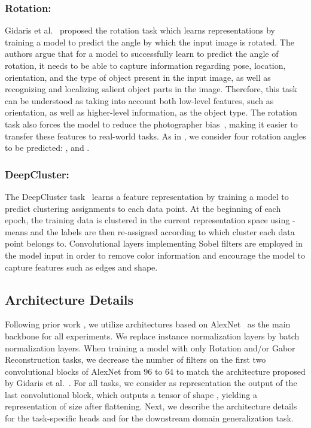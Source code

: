 \documentclass[runningheads]{llncs}
\begin{document}
\vspace{-5pt}\subsubsection{Rotation:} Gidaris et al.~\cite{gidaris2018unsupervised} proposed the rotation task which learns representations by training a model to predict the angle by which the input image is rotated. The authors argue that for a model to successfully learn to predict the angle of rotation, it needs to be able to capture information regarding pose, location, orientation, and the type of object present in the input image, as well as recognizing and localizing salient object parts in the image. Therefore, this task can be understood as taking into account both low-level features, such as orientation, as well as higher-level information, as the object type. 
The rotation task also forces the model to reduce the photographer bias~\cite{feng2019self}, making it easier to transfer these features to real-world tasks. 
As in \cite{gidaris2018unsupervised}, we consider four rotation angles to be predicted: , and .

\vspace{-5pt}\subsubsection{DeepCluster:}
The DeepCluster task~\cite{caron2018deep} learns a feature representation by training a model to predict clustering assignments to each data point. At the beginning of each epoch, the training data is clustered in the current representation space using -means and the labels are then re-assigned according to which cluster each data point belongs to. Convolutional layers implementing Sobel filters are employed in the model input in order to remove color information and encourage the model to capture features such as edges and shape.  

\subsection{Architecture Details}\label{sec:arch}
Following prior work \cite{li2017deeper,li2018domain,carlucci2019domain,caron2018deep,gidaris2018unsupervised}, we utilize architectures based on AlexNet~\cite{krizhevsky2012imagenet} as the main backbone for all experiments. We replace instance normalization layers by batch normalization layers. When training a model with only Rotation and/or Gabor Reconstruction tasks, we decrease the number of filters on the first two convolutional blocks of AlexNet from 96 to 64 to match the architecture proposed by Gidaris et al.~\cite{gidaris2018unsupervised}. For all tasks, we consider as representation the output of the last convolutional block, which outputs a tensor of shape , yielding a representation of size  after flattening. Next, we describe the architecture details for the task-specific heads and for the downstream domain generalization task.
\end{document}
